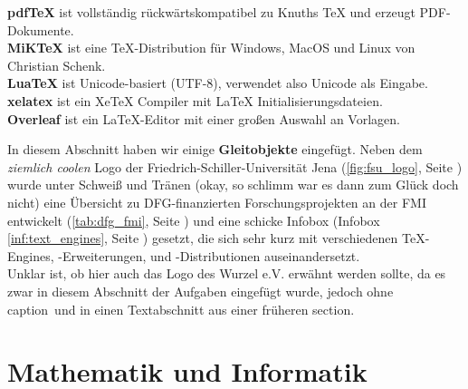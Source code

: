 \documentclass[titlepage]{scrartcl}
\theoremstyle{das_hat_stil}
\begin{document}
\begin{infobox}[h]
  \caption{\TeX-Engines, -Erweiterungen, und -Distributionen}
  \label{inf:text_engines}
  \begin{tcolorbox}[
    colback=cyan!5!white,
    colframe=cyan!80!black,
    arc=2mm
  ]
    \textbf{pdfTeX} ist vollständig rückwärtskompatibel zu Knuths TeX und erzeugt PDF-Dokumente. \\ [10pt]
    \textbf{MiKTeX} ist eine TeX-Distribution für Windows, MacOS und Linux von Christian Schenk. \\ [10pt]
    \textbf{LuaTeX} ist Unicode-basiert (UTF-8), verwendet also Unicode als Eingabe. \\ [10pt]
    \textbf{xelatex} ist ein XeTeX Compiler mit LaTeX Initialisierungsdateien. \\ [10pt]
    \textbf{Overleaf} ist ein LaTeX-Editor mit einer großen Auswahl an Vorlagen.
  \end{tcolorbox}
\end{infobox}


In diesem Abschnitt haben wir einige \textbf{Gleitobjekte} eingefügt. Neben dem \textit{ziemlich coolen} Logo der Friedrich-Schiller-Universität Jena (\autoref{fig:fsu_logo}, Seite \pageref{fig:fsu_logo}) wurde unter Schweiß und Tränen (okay, so schlimm war es dann zum Glück doch nicht) eine Übersicht zu DFG-finanzierten Forschungsprojekten an der FMI entwickelt (\autoref{tab:dfg_fmi}, Seite \pageref{tab:dfg_fmi}) und eine schicke Infobox (Infobox \ref{inf:text_engines}, Seite \pageref{inf:text_engines}) gesetzt, die sich sehr kurz mit verschiedenen \TeX-Engines, -Erweiterungen, und -Distributionen auseinandersetzt. \\
Unklar ist, ob hier auch das Logo des Wurzel e.V. erwähnt werden sollte, da es zwar in diesem Abschnitt der Aufgaben eingefügt wurde, jedoch ohne \glqq caption\grqq\ und in einen Textabschnitt aus einer früheren \glqq section\grqq .




\newpage

\section{Mathematik und Informatik}
\end{document}
